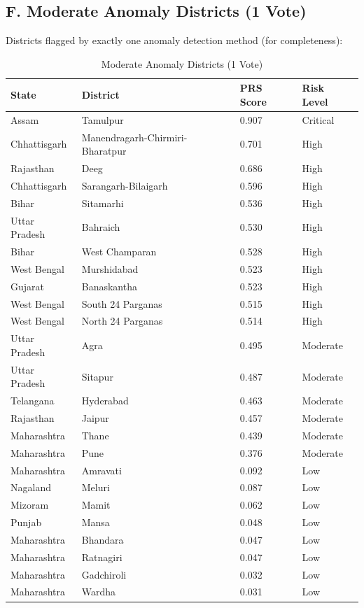 \documentclass[11pt, a4paper]{article}
\begin{document}
\subsection{F. Moderate Anomaly Districts (1 Vote)}

Districts flagged by exactly one anomaly detection method (for completeness):


\vspace{0.8em}
\begin{table}[H]
\caption{Moderate Anomaly Districts (1 Vote)}
{\scriptsize
\begin{tabularx}{\textwidth}{|Y|Y|Y|Y|}
\hline
\textbf{State} & \textbf{District} & \textbf{PRS Score} & \textbf{Risk Level} \\ \hline
Assam & Tamulpur & 0.907 & Critical \\ \hline
Chhattisgarh & Manendragarh-Chirmiri-Bharatpur & 0.701 & High \\ \hline
Rajasthan & Deeg & 0.686 & High \\ \hline
Chhattisgarh & Sarangarh-Bilaigarh & 0.596 & High \\ \hline
Bihar & Sitamarhi & 0.536 & High \\ \hline
Uttar Pradesh & Bahraich & 0.530 & High \\ \hline
Bihar & West Champaran & 0.528 & High \\ \hline
West Bengal & Murshidabad & 0.523 & High \\ \hline
Gujarat & Banaskantha & 0.523 & High \\ \hline
West Bengal & South 24 Parganas & 0.515 & High \\ \hline
West Bengal & North 24 Parganas & 0.514 & High \\ \hline
Uttar Pradesh & Agra & 0.495 & Moderate \\ \hline
Uttar Pradesh & Sitapur & 0.487 & Moderate \\ \hline
Telangana & Hyderabad & 0.463 & Moderate \\ \hline
Rajasthan & Jaipur & 0.457 & Moderate \\ \hline
Maharashtra & Thane & 0.439 & Moderate \\ \hline
Maharashtra & Pune & 0.376 & Moderate \\ \hline
Maharashtra & Amravati & 0.092 & Low \\ \hline
Nagaland & Meluri & 0.087 & Low \\ \hline
Mizoram & Mamit & 0.062 & Low \\ \hline
Punjab & Mansa & 0.048 & Low \\ \hline
Maharashtra & Bhandara & 0.047 & Low \\ \hline
Maharashtra & Ratnagiri & 0.047 & Low \\ \hline
Maharashtra & Gadchiroli & 0.032 & Low \\ \hline
Maharashtra & Wardha & 0.031 & Low \\ \hline
\end{tabularx}
}
\end{table}
\vspace{1em}
\end{document}
